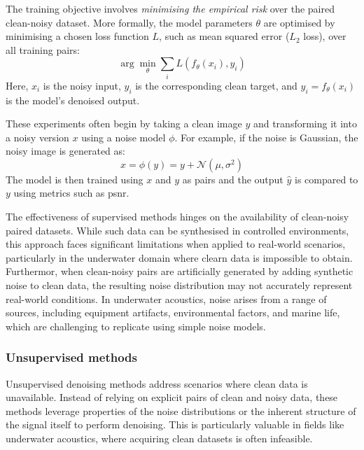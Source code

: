 The training objective involves \textit{minimising the empirical risk} over the paired clean-noisy dataset. More formally, the model parameters $\theta$ are optimised by minimising a chosen loss function $L$, such as mean squared error ($L_2$ loss), over all training pairs:
\begin{equation}
    \arg \min_\theta \sum_i L(f_\theta (x_i), y_i)
\end{equation}
Here, $x_i$ is the noisy input, $y_i$ is the corresponding clean target, and $\hat{y}_i = f_\theta(x_i)$ is the model's denoised output.

These experiments often begin by taking a clean image $y$ and transforming it into a noisy version \( x \) using a noise model \(\phi\). For example, if the noise is Gaussian, the noisy image is generated as:
\begin{equation}
    x = \phi(y) = y + \mathcal{N}(\mu, \sigma^2)
\end{equation}
The model is then trained using $x$ and $y$ as pairs and the output $\hat{y}$ is compared to $y$ using metrics such as \acrshort{psnr}.

The effectiveness of supervised methods hinges on the availability of clean-noisy paired datasets. While such data can be synthesised in controlled environments, this approach faces significant limitations when applied to real-world scenarios, particularly in the underwater domain where clearn data is impossible to obtain. Furthermor, when clean-noisy pairs are artificially generated by adding synthetic noise to clean data, the resulting noise distribution may not accurately represent real-world conditions. In underwater acoustics, noise arises from a range of sources, including equipment artifacts, environmental factors, and marine life, which are challenging to replicate using simple noise models.

\subsubsection{Unsupervised methods}

Unsupervised denoising methods address scenarios where clean data is unavailable. Instead of relying on explicit pairs of clean and noisy data, these methods leverage properties of the noise distributions or the inherent structure of the signal itself to perform denoising. This is particularly valuable in fields like underwater acoustics, where acquiring clean datasets is often infeasible.

